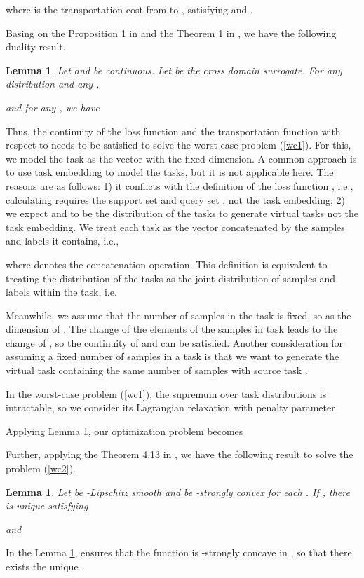 \documentclass{article}
\newtheorem{lemma}[theorem]{Lemma}
\begin{document}
where  is the transportation cost from  to , satisfying  and .

Basing on the Proposition 1 in \cite{DBLP:conf/iclr/SinhaND18} and the Theorem 1 in \cite{blanchet2019quantifying}, we have the following duality result.
\begin{lemma}\label{lm1}
Let  and  be continuous. Let  be the cross domain surrogate. For any distribution  and any ,

and for any , we have

\end{lemma}

Thus, the continuity of the loss function  and the transportation function  with respect to  needs to be satisfied to solve the worst-case problem (\ref{wc1}). For this, we model the task  as the vector with the fixed dimension. A common approach is to use task embedding to model the tasks, but it is not applicable here. The reasons are as follows: 1) it conflicts with the definition of the loss function , i.e., calculating  requires the support set  and query set , not the task embedding; 2) we expect  and  to be the distribution of the tasks to generate virtual tasks not the task embedding. We treat each task as the vector concatenated by the samples and labels it contains, i.e.,

where  denotes the concatenation operation. This definition is equivalent to treating the distribution of the tasks as the joint distribution of samples and labels within the task, i.e.

Meanwhile, we assume that the number of samples in the task  is fixed, so as the dimension of . The change of the elements of the samples in task  leads to the change of , so the continuity of  and  can be satisfied. Another consideration for assuming a fixed number of samples in a task is that we want to generate the virtual task containing the same number of samples with source task .

In the worst-case problem (\ref{wc1}), the supremum over task distributions is intractable, so we consider its Lagrangian relaxation with penalty parameter 

Applying Lemma \ref{lm1}, our optimization problem becomes

Further, applying the Theorem 4.13 in \cite{bonnans2013perturbation}, we have the following result to solve the problem (\ref{wc2}).
\begin{lemma}\label{lm2}
Let  be -Lipschitz smooth and  be -strongly convex for each . If , there is unique  satisfying

and 

\end{lemma}
In the Lemma \ref{lm2},  ensures that the function  is -strongly concave in , so that there exists the unique .
\end{document}
